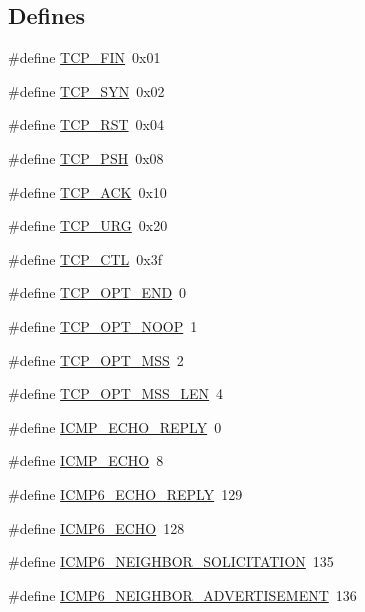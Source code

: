 \subsection*{Defines}
\begin{DoxyCompactItemize}
\item 
\#define \hyperlink{group__uip_ga88e60aa2cf23e1c65d630701db08c743}{TCP\_\-FIN}~0x01
\item 
\#define \hyperlink{group__uip_ga6020613f5062417d9811cfa837215c83}{TCP\_\-SYN}~0x02
\item 
\#define \hyperlink{group__uip_ga5ca559def464ef20d8b1f7d32f2f160d}{TCP\_\-RST}~0x04
\item 
\#define \hyperlink{group__uip_ga1320fd0006a2f70138bc2d0018dda829}{TCP\_\-PSH}~0x08
\item 
\#define \hyperlink{group__uip_ga44b3b1ab31a403ba28ec135adfcbefef}{TCP\_\-ACK}~0x10
\item 
\#define \hyperlink{group__uip_gac84f499cba8a02fc0e306c10b2acabf0}{TCP\_\-URG}~0x20
\item 
\#define \hyperlink{group__uip_ga1425d4a0c2760adb653a04c0fb137a8d}{TCP\_\-CTL}~0x3f
\item 
\#define \hyperlink{group__uip_ga1215163245304bad20d6c5608ad75ab7}{TCP\_\-OPT\_\-END}~0
\item 
\#define \hyperlink{group__uip_ga9f1822e1d231235edacad691f3cb7bbb}{TCP\_\-OPT\_\-NOOP}~1
\item 
\#define \hyperlink{group__uip_ga691688604655ea8943d15f14c60027d8}{TCP\_\-OPT\_\-MSS}~2
\item 
\#define \hyperlink{group__uip_ga12f3bf821224b8e7b48a57ed3cea15cf}{TCP\_\-OPT\_\-MSS\_\-LEN}~4
\item 
\#define \hyperlink{group__uip_ga5c5b1834e497f53ad0ef947bbe9777fa}{ICMP\_\-ECHO\_\-REPLY}~0
\item 
\#define \hyperlink{group__uip_gad58231410d58e34b455328b888a9e73c}{ICMP\_\-ECHO}~8
\item 
\#define \hyperlink{group__uip_ga207d17b633cd095120a74bc1f2257b17}{ICMP6\_\-ECHO\_\-REPLY}~129
\item 
\#define \hyperlink{group__uip_ga4cc3e223b63f27b546d62e9a258dba5a}{ICMP6\_\-ECHO}~128
\item 
\#define \hyperlink{group__uip_ga1cea57e3ea526f210b1068e6dcf7b4f4}{ICMP6\_\-NEIGHBOR\_\-SOLICITATION}~135
\item 
\#define \hyperlink{group__uip_ga62c03e0a308cc23929a80fe8d8f9dc1e}{ICMP6\_\-NEIGHBOR\_\-ADVERTISEMENT}~136
\item 

\end{DoxyCompactItemize}
